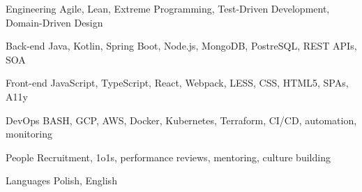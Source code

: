 

\begin{cvskills}

  \cvskill
  {Engineering} %
  {Agile, Lean, Extreme Programming, Test-Driven Development, Domain-Driven Design} %

  \cvskill
    {Back-end} %
    {Java, Kotlin, Spring Boot, Node.js, MongoDB, PostreSQL, REST APIs, SOA} %

  \cvskill
    {Front-end} %
    {JavaScript, TypeScript, React, Webpack, LESS, CSS, HTML5, SPAs, A11y} %

  \cvskill
  {DevOps} %
  {BASH, GCP, AWS, Docker, Kubernetes, Terraform, CI/CD, automation, monitoring} %

  \cvskill
    {People} %
    {Recruitment, 1o1s, performance reviews, mentoring, culture building} %

  \cvskill
    {Languages} %
    {Polish, English} %

\end{cvskills}
